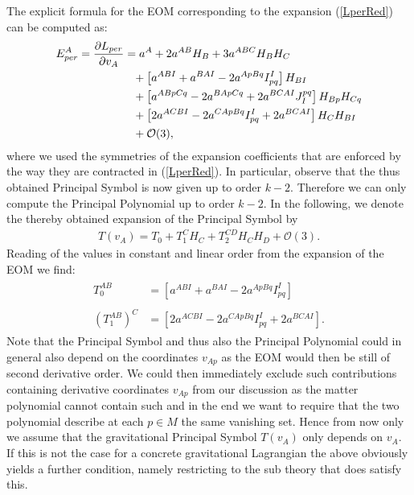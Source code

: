 \documentclass[a4paper,12pt, DIV=14, BCOR=5mm, twoside, headsepline, numbers=noenddot]{scrbook}
\begin{document}
The explicit formula for the EOM corresponding to the expansion (\ref{LperRed}) can be computed as:
\begin{align}\label{EOMPert}
    \begin{aligned}
    E_{per}^A = \frac{\partial L_{per}}{\partial v_A} &= a^A + 2 a^{AB}H_B + 3a^{ABC}H_B H_C \\
    &\hphantom{=}+ \left [a^{ABI} + a^{BAI} - 2 a^{ApBq}I_{pq}^I  \right ] H_{BI} \\
    &\hphantom{=}+ \left[a^{ABpCq} -2a^{BApCq} +2a^{BCAI} J_I^{pq} \right]H_{Bp}H_{Cq} \\
    &\hphantom{=}+ \left [2a^{ACBI} -2a^{CApBq}I_{pq}^I + 2a^{BCAI} \right ]H_C H_{BI} \\
    &\hphantom{=}+ \mathcal{O}(3),
    \end{aligned}
\end{align}
where we used the symmetries of the expansion coefficients that are enforced by the way they are contracted in (\ref{LperRed}).
In particular, observe that the thus obtained Principal Symbol is now given up to order $k-2$. Therefore we can only compute the Principal Polynomial up to order $k-2$. In the following, we denote the thereby obtained expansion of the Principal Symbol by 
\begin{align}
    T(v_A) = T_0 + T_1^CH_C + T_2^{CD}H_CH_D + \mathcal{O}(3).
\end{align}
Reading of the values in constant and linear order from the expansion of the EOM we find:
\begin{align}
    \begin{aligned}
    T_0^{AB} &= \left [a^{ABI} + a^{BAI} - 2 a^{ApBq}I_{pq}^I  \right ]\\
    \\
    (T_1^{AB})^C &= \left [2a^{ACBI} -2a^{CApBq}I_{pq}^I + 2a^{BCAI} \right ]. 
    \end{aligned}
\end{align}
Note that the Principal Symbol and thus also the Principal Polynomial could in general also depend on the coordinates $v_{Ap}$ as the EOM would then be still of second derivative order. We could then immediately exclude such contributions containing derivative coordinates $v_{Ap}$ from our discussion as the matter polynomial cannot contain such and in the end we want to require that the two polynomial describe at each $p \in M$ the same vanishing set. Hence from now only we assume that the gravitational Principal Symbol $T(v_A)$ only depends on $v_A$. If this is not the case for a concrete gravitational Lagrangian the above obviously yields a further condition, namely restricting to the sub theory that does satisfy this. 
\end{document}
